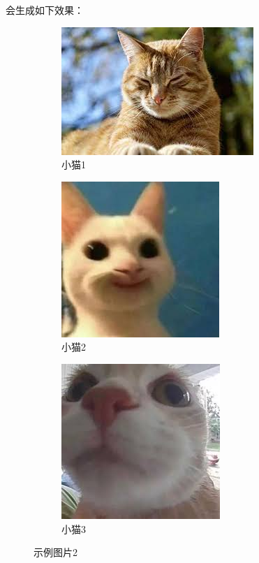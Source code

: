 \noindent 会生成如下效果：

\begin{figure}[htb!]
    \centering
    \begin{subfigure}{.4\textwidth}
        \centering
        \includegraphics[height=.15\textheight]{./img/cat1.jpeg}
        \caption{小猫1}
        \label{fig_cat_1}
    \end{subfigure}
    \begin{subfigure}{.25\textwidth}
        \centering
        \includegraphics[height=.15\textheight]{./img/cat2.jpeg}
        \caption{小猫2}
        \label{fig_cat_2}
    \end{subfigure}
    \begin{subfigure}{.25\textwidth}
        \centering
        \includegraphics[height=.15\textheight]{./img/cat3.jpeg}
        \caption{小猫3}
        \label{fig_cat_3}
    \end{subfigure}
    \caption{示例图片2}
    \label{fig_cat}
\end{figure}

